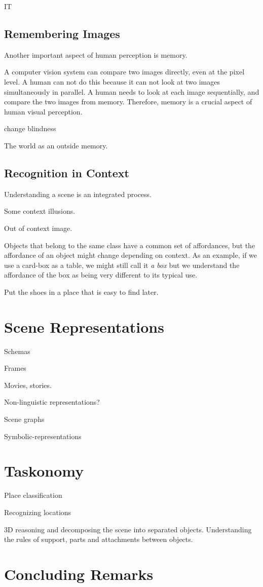IT

\subsection{Remembering Images}

Another important aspect of human perception is memory.

A computer vision system can compare two images directly, even at the pixel level. A human can not do this because it can not look at two images simultaneously in parallel. A human needs to look at each image sequentially, and compare the two images from memory. Therefore, memory is a crucial aspect of human visual perception. 

change blindness

The world as an outside memory. 

\subsection{Recognition in Context}

Understanding a scene is an integrated process. 

Some context illusions. 

Out of context image.

Objects that belong to the same class have a common set of affordances, but the affordance of an object might change depending on context. As an example, if we use a card-box as a table, we might still call it {\em a box} but we understand the affordance of the box as being very different to its typical use. 

Put the shoes in a place that is easy to find later. 



\section{Scene Representations}

Schemas

Frames

Movies, stories.


Non-linguistic representations?

Scene graphs

Symbolic-representations


\section{Taskonomy}

Place classification

Recognizing locations

3D reasoning and decomposing the scene into separated objects. Understanding the rules of support, parts and attachments between objects. 


\section{Concluding Remarks}

